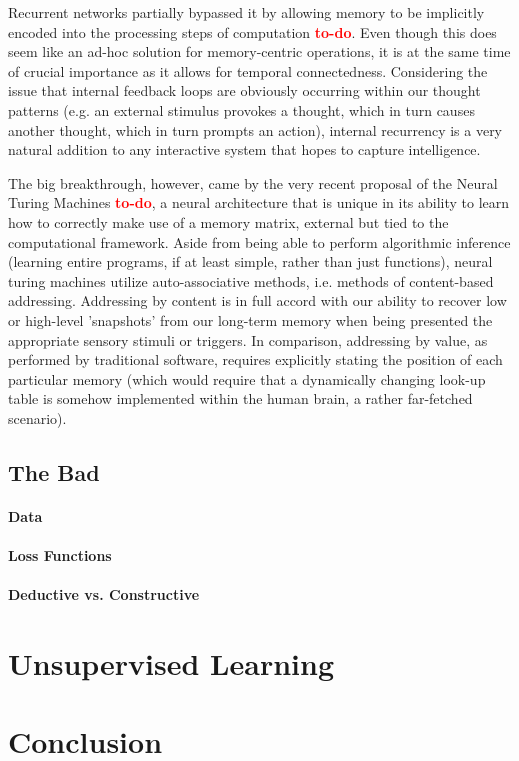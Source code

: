 \documentclass[]{article}
\newcommand\todo{\textcolor{red}{\bf{to-do}}}
\begin{document}
Recurrent networks partially bypassed it by allowing memory to be implicitly encoded into the processing steps of computation \todo . Even though this does seem like an ad-hoc solution for memory-centric operations, it is at the same time of crucial importance as it allows for temporal connectedness. Considering the issue that internal feedback loops are obviously occurring within our thought patterns (e.g. an external stimulus provokes a thought, which in turn causes another thought, which in turn prompts an action), internal recurrency is a very natural addition to any interactive system that hopes to capture intelligence.

The big breakthrough, however, came by the very recent proposal of the Neural Turing Machines \todo , a neural architecture that is unique in its ability to learn how to correctly make use of a memory matrix, external but tied to the computational framework. Aside from being able to perform algorithmic inference (learning entire programs, if at least simple, rather than just functions), neural turing machines utilize auto-associative methods, i.e. methods of content-based addressing. Addressing by content is in full accord with our ability to recover low or high-level 'snapshots' from our long-term memory when being presented the appropriate sensory stimuli or triggers. In comparison, addressing by value, as performed by traditional software, requires explicitly stating the position of each particular memory (which would require that a dynamically changing look-up table is somehow implemented within the human brain, a rather far-fetched scenario).

\subsection{The Bad}

\paragraph{Data}

\paragraph{Loss Functions}

\paragraph{Deductive vs. Constructive}

\section{Unsupervised Learning}

\section{Conclusion}



\end{document}
